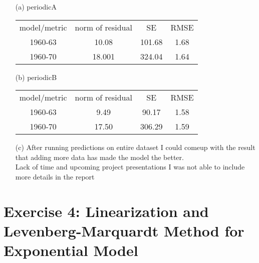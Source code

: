 \documentclass[unicode,11pt,a4paper,oneside,numbers=endperiod,openany]{scrartcl}
\begin{document}
\begin{itemize}
	\item [(a)] periodicA
	    
    \begin{center}
        \begin{tabular}{ c c c c}
         model/metric & norm of residual & SE & RMSE\\ 
         1960-63 & 10.08 & 101.68 & 1.68\\ 
         1960-70 & 18.001 & 324.04 & 1.64\\ 
        \end{tabular}
    \end{center}
    
    
	\item [(b)] periodicB
	\begin{center}
        \begin{tabular}{ c c c c}
         model/metric & norm of residual & SE & RMSE\\ 
         1960-63 & 9.49 & 90.17 & 1.58\\ 
         1960-70 & 17.50 & 306.29 & 1.59\\ 
        \end{tabular}
    \end{center}
	\item [(c)]
	{After running predictions on entire dataset I could comeup with the result that adding more data has made the model the better.}\\
	
	{Lack of time and upcoming project presentations I was not able to include more details in the report}
	
\end{itemize}


\section*{Exercise 4: Linearization and Levenberg-Marquardt Method for Exponential Model}
\end{document}
